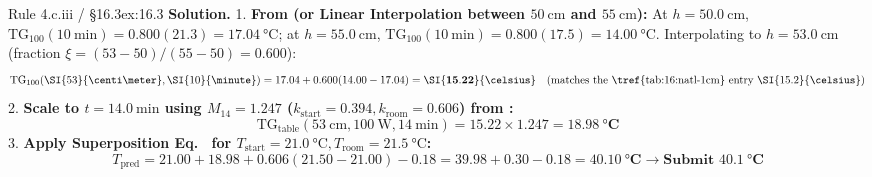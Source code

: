 \begin{workedexample}{Rule 4.c.iii / §16.3}{ex:16.3}
\textbf{Solution.}
1. \textbf{From  (or Linear Interpolation between $\SI{50}{\centi\meter}$ and $\SI{55}{\centi\meter}$):}
At $h = \SI{50.0}{\centi\meter}$, $\mathrm{TG}_{100}(\SI{10}{\minute}) = 0.800(21.3) = \SI{17.04}{\celsius}$; at $h = \SI{55.0}{\centi\meter}$, $\mathrm{TG}_{100}(\SI{10}{\minute}) = 0.800(17.5) = \SI{14.00}{\celsius}$. Interpolating to $h = \SI{53.0}{\centi\meter}$ (fraction $\xi = (53-50)/(55-50) = 0.600$):
\[
  \mathrm{TG}_{100}(\SI{53}{\centi\meter}, \SI{10}{\minute}) = 17.04 + 0.600(14.00 - 17.04) = \mathbf{\SI{15.22}{\celsius}} \quad (\text{matches the \tref{tab:16:natl-1cm} entry }\SI{15.2}{\celsius})
\]
2. \textbf{Scale to $t = \SI{14.0}{\minute}$ using $M_{14} = 1.247$ ($k_{\mathrm{start}} = 0.394, k_{\mathrm{room}} = 0.606$) from :}
\[
  \mathrm{TG}_{\mathrm{table}}(\SI{53}{\centi\meter}, \SI{100}{\watt}, \SI{14}{\minute}) = 15.22 \times 1.247 = \mathbf{\SI{18.98}{\celsius}}
\]
3. \textbf{Apply Superposition Eq.~ for $T_{\mathrm{start}} = \SI{21.0}{\celsius}, T_{\mathrm{room}} = \SI{21.5}{\celsius}$:}
\[
  T_{\mathrm{pred}} = 21.00 + 18.98 + 0.606(21.50 - 21.00) - 0.18 = 39.98 + 0.30 - 0.18 = \mathbf{\SI{40.10}{\celsius} \longrightarrow \text{Submit }\SI{40.1}{\celsius}}
\]
\end{workedexample}

